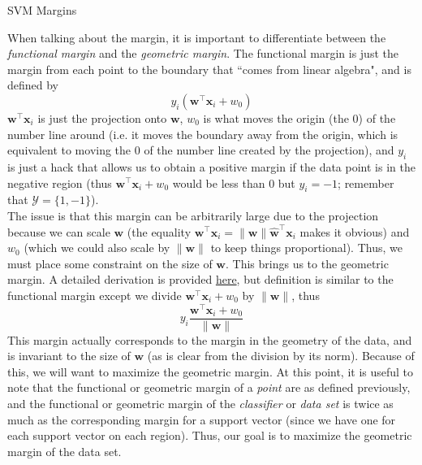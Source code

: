 \documentclass[12pt]{article}
\newcommand{\norm}[1]{\lVert#1\rVert}
\begin{document}
\begin{center}
	\LARGE{SVM Margins}
\end{center}
When talking about the margin, it is important to differentiate between the \textit{functional margin} and the \textit{geometric margin}. The functional margin is just the margin from each point to the boundary that ``comes from linear algebra", and is defined by
\[ y_i(\mathbf{w}^\top\mathbf{x}_i + w_0) \]
$\mathbf{w}^\top\mathbf{x}_i$ is just the projection onto $\mathbf{w}$, $w_0$ is what moves the origin (the 0) of the number line around (i.e. it moves the boundary away from the origin, which is equivalent to moving the 0 of the number line created by the projection), and $y_i$ is just a hack that allows us to obtain a positive margin if the data point is in the negative region (thus $\mathbf{w}^\top\mathbf{x}_i + w_0$ would be less than $0$ but $y_i = -1$; remember that $\mathcal{Y} = \{1, -1\}$).
\\\newline
The issue is that this margin can be arbitrarily large due to the projection because we can scale $\mathbf{w}$ (the equality $\mathbf{w}^\top\mathbf{x}_i = \norm{\mathbf{w}}\mathbf{\hat{w}}^\top\mathbf{x}_i$ makes it obvious) and $w_0$ (which we could also scale by $\norm{\mathbf{w}}$ to keep things proportional). Thus, we must place some constraint on the size of $\mathbf{w}$. This brings us to the geometric margin. A detailed derivation is provided \href{https://nlp.stanford.edu/IR-book/html/htmledition/support-vector-machines-the-linearly-separable-case-1.html}{here}, but definition is similar to the functional margin except we divide $\mathbf{w}^\top\mathbf{x}_i + w_0$ by $\norm{\mathbf{w}}$, thus
\[ y_i\frac{\mathbf{w}^\top\mathbf{x}_i + w_0}{\norm{\mathbf{w}}} \]
This margin actually corresponds to the margin in the geometry of the data, and is invariant to the size of $\mathbf{w}$ (as is clear from the division by its norm). Because of this, we will want to maximize the geometric margin. At this point, it is useful to note that the functional or geometric margin of a \textit{point} are as defined previously, and the functional or geometric margin of the \textit{classifier} or \textit{data set} is twice as much as the corresponding margin for a support vector (since we have one for each support vector on each region). Thus, our goal is to maximize the geometric margin of the data set.
\\\newline
\end{document}
